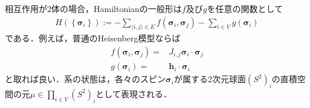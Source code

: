 \documentclass[a4,10pt, platex, dvipdfmx]{jsarticle}
\newcommand{\pair}[2]{\langle #1, #2 \rangle}
\newcommand{\dotprod}[2]{#1 \cdot #2}
\newcommand{\spin}{\bm{\sigma}}
\begin{document}
    相互作用が2体の場合，Hamiltonianの一般形は$f$及び$g$を任意の関数として
    \begin{align}
        H\left( \left\{\spin_{i}\right\} \right) := - \sum_{\pair{i}{j} \in E} f\left(\spin_{i}, \spin_{j}\right) - \sum_{i \in V}g\left(\spin_{i}\right)
    \end{align}
    である．例えば，普通のHeisenberg模型ならば
    \begin{align}
        f\left(\spin_{i}, \spin_{j}\right) = & J_{i, j} \dotprod{\spin_{i}}{\spin_{j}} \\
        g\left(\spin_{i}\right) = & \dotprod{\bm{h}_{i}}{\spin_{i}}
    \end{align}
    と取れば良い．系の状態は，各々のスピン$\spin_{i}$が属する2次元球面$\left(S^{2}\right)_{i}$の直積空間の元$\mu \in \prod_{i \in V}\left(S^{2}\right)_{i}$として表現される．
    
\end{document}
